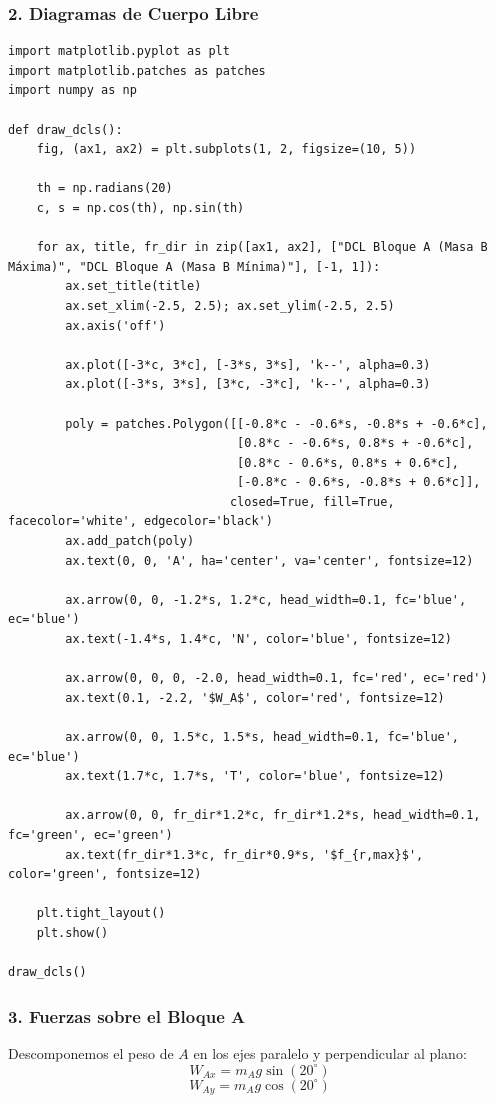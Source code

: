 \documentclass[12pt, a4paper]{article}
\begin{document}
\subsubsection*{2. Diagramas de Cuerpo Libre}

\begin{lstlisting}
import matplotlib.pyplot as plt
import matplotlib.patches as patches
import numpy as np

def draw_dcls():
    fig, (ax1, ax2) = plt.subplots(1, 2, figsize=(10, 5))
    
    th = np.radians(20)
    c, s = np.cos(th), np.sin(th)
    
    for ax, title, fr_dir in zip([ax1, ax2], ["DCL Bloque A (Masa B Máxima)", "DCL Bloque A (Masa B Mínima)"], [-1, 1]):
        ax.set_title(title)
        ax.set_xlim(-2.5, 2.5); ax.set_ylim(-2.5, 2.5)
        ax.axis('off')
        
        ax.plot([-3*c, 3*c], [-3*s, 3*s], 'k--', alpha=0.3)
        ax.plot([-3*s, 3*s], [3*c, -3*c], 'k--', alpha=0.3)
        
        poly = patches.Polygon([[-0.8*c - -0.6*s, -0.8*s + -0.6*c], 
                                [0.8*c - -0.6*s, 0.8*s + -0.6*c], 
                                [0.8*c - 0.6*s, 0.8*s + 0.6*c], 
                                [-0.8*c - 0.6*s, -0.8*s + 0.6*c]], 
                               closed=True, fill=True, facecolor='white', edgecolor='black')
        ax.add_patch(poly)
        ax.text(0, 0, 'A', ha='center', va='center', fontsize=12)
        
        ax.arrow(0, 0, -1.2*s, 1.2*c, head_width=0.1, fc='blue', ec='blue')
        ax.text(-1.4*s, 1.4*c, 'N', color='blue', fontsize=12)
        
        ax.arrow(0, 0, 0, -2.0, head_width=0.1, fc='red', ec='red')
        ax.text(0.1, -2.2, '$W_A$', color='red', fontsize=12)
        
        ax.arrow(0, 0, 1.5*c, 1.5*s, head_width=0.1, fc='blue', ec='blue')
        ax.text(1.7*c, 1.7*s, 'T', color='blue', fontsize=12)
        
        ax.arrow(0, 0, fr_dir*1.2*c, fr_dir*1.2*s, head_width=0.1, fc='green', ec='green')
        ax.text(fr_dir*1.3*c, fr_dir*0.9*s, '$f_{r,max}$', color='green', fontsize=12)

    plt.tight_layout()
    plt.show()

draw_dcls()
\end{lstlisting}

\subsubsection*{3. Fuerzas sobre el Bloque A}
Descomponemos el peso de $A$ en los ejes paralelo y perpendicular al plano:
$$ W_{Ax} = m_A g \sin(20^\circ) $$
$$ W_{Ay} = m_A g \cos(20^\circ) $$
\end{document}
